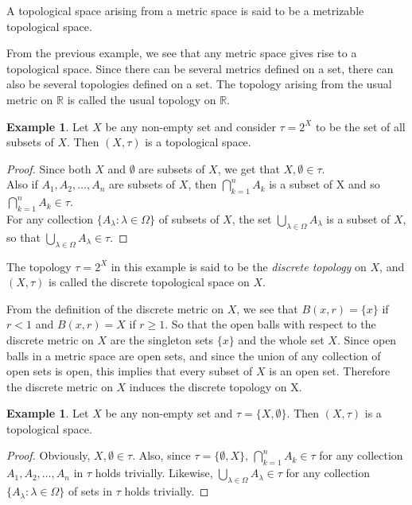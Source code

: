 \documentclass[11pt,a4paper]{article}
\theoremstyle{definition}
\newtheorem{exa}[thm]{Example}
\begin{document}
A topological space arising from a metric space is said to be a metrizable topological space.


From the previous example, we see that any metric space gives rise to a topological space. Since there can be several metrics defined on a set, there can also be several topologies defined on a set. The topology arising from the usual metric on $\mathbb{R}$ is called the usual topology on $\mathbb{R}$.

\begin{exa}
Let $X$ be any non-empty set and consider $\tau =2^X$ to be the set of all subsets of $X$. Then $(X,\tau)$ is a topological space.
\end{exa}



\begin{proof}
Since both $X$ and $\emptyset$ are subsets of $X$, we get that $X,\emptyset \in \tau$.\\ 
Also if $A_1,A_2,\ldots,A_n$ are subsets of $X$, then $\bigcap^n_{k=1}A_k$ is a subset of X and so $\bigcap^n_{k=1}A_k \in \tau$.\\ 
For any collection $\{A_{\lambda}:\lambda \in \Omega \}$ of subsets of $X$, the set $\bigcup_{\lambda \in \Omega} A_{\lambda}$ is a subset of $X$, so that $\bigcup_{\lambda \in \Omega} A_{\lambda} \in \tau$.
\end{proof}

The topology $\tau =2^X$ in this example is said to be the \emph{discrete topology} on $X$, and $(X,\tau)$ is called the discrete topological space on $X$.


From the definition of the discrete metric on $X$, we see that $B(x,r)=\{x\}$ if $r<1$ and $B(x,r)=X$ if $r\geq 1$. So that the open balls with respect to the discrete metric on $X$ are the singleton sets $\{x\}$ and the whole set $X$. Since open balls in a metric space are open sets, and since the union of any collection of open sets is open, this implies that every subset of $X$ is an open set. Therefore the discrete metric on $X$ induces the discrete topology on X.


\begin{exa}
Let $X$ be any non-empty set and $\tau =\{X,\emptyset \}$. Then $(X,\tau)$ is a topological space.
\end{exa}

\begin{proof}
Obviously, $X,\emptyset \in \tau$. Also, since $\tau =\{\emptyset ,X\}$, $\bigcap^n_{k=1}A_k\in \tau$ for any collection $A_1,A_2,\ldots,A_n$ in $\tau$ holds trivially. Likewise, $\bigcup_{\lambda \in \Omega}A_{\lambda} \in \tau$ for any collection $\{A_{\lambda}:\lambda \in \Omega \}$ of sets in $\tau$ holds trivially.
\end{proof}
\end{document}
